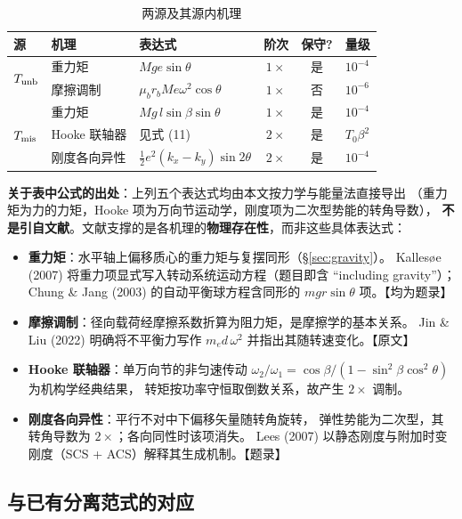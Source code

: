 \documentclass[11pt,a4paper]{ctexart}
\begin{document}
\begin{table}[h]
\centering
\caption{两源及其源内机理}
\small
\begin{tabular}{@{}p{1.7cm}p{1.7cm}p{3.0cm}ccp{1.3cm}@{}}
\toprule
源 & 机理 & 表达式 & 阶次 & 保守? & 量级 \\
\midrule
\multirow{2}{*}{\(T_{\rm unb}\)} & 重力矩 & \(Mge\sin\theta\) & \(1\times\) & 是 & \(10^{-4}\) \\
 & 摩擦调制 & \(\mu_b r_bMe\omega^2\cos\theta\) & \(1\times\) & 否 & \(10^{-6}\) \\
\midrule
\multirow{3}{*}{\(T_{\rm mis}\)} & 重力矩 & \(Mg\,l\sin\beta\sin\theta\) & \(1\times\) & 是 & \(10^{-4}\) \\
 & Hooke 联轴器 & 见式 (11) & \(2\times\) & 是 & \(T_0\beta^2\) \\
 & 刚度各向异性 & \(\tfrac12e^2(k_x-k_y)\sin2\theta\) & \(2\times\) & 是 & \(10^{-4}\) \\
\bottomrule
\end{tabular}
\end{table}

\noindent
\textbf{关于表中公式的出处}：上列五个表达式均由本文按力学与能量法直接导出
（重力矩为力的力矩，Hooke 项为万向节运动学，刚度项为二次型势能的转角导数），
\textbf{不是引自文献}。文献支撑的是各机理的\textbf{物理存在性}，而非这些具体表达式：

\begin{itemize}[leftmargin=1.2em]
\item \textbf{重力矩}：水平轴上偏移质心的重力矩与复摆同形（\S\ref{sec:gravity}）。
  Kallesøe (2007) 将重力项显式写入转动系统运动方程（题目即含 “including gravity”）；
  Chung \& Jang (2003) 的自动平衡球方程含同形的 \(mgr\sin\theta\) 项。【均为题录】
\item \textbf{摩擦调制}：径向载荷经摩擦系数折算为阻力矩，是摩擦学的基本关系。
  Jin \& Liu (2022) 明确将不平衡力写作 \(m_e d\,\omega^2\) 并指出其随转速变化。【原文】
\item \textbf{Hooke 联轴器}：单万向节的非匀速传动
  \(\omega_2/\omega_1=\cos\beta/(1-\sin^2\beta\cos^2\theta)\) 为机构学经典结果，
  转矩按功率守恒取倒数关系，故产生 \(2\times\) 调制。
\item \textbf{刚度各向异性}：平行不对中下偏移矢量随转角旋转，
  弹性势能为二次型，其转角导数为 \(2\times\)；各向同性时该项消失。
  Lees (2007) 以静态刚度与附加时变刚度（SCS + ACS）解释其生成机制。【题录】
\end{itemize}

\subsection{与已有分离范式的对应}
\end{document}
